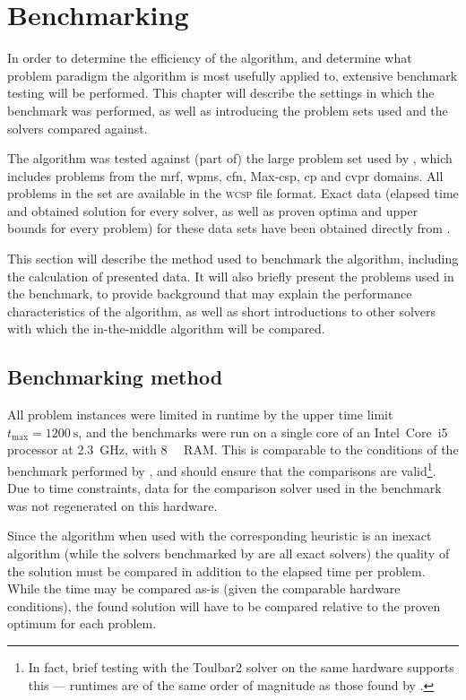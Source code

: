 \chapter{Benchmarking}
In order to determine the efficiency of the algorithm, and determine what problem paradigm the algorithm is most usefully applied to, extensive benchmark testing will be performed.
This chapter will describe the settings in which the benchmark was performed, as well as introducing the problem sets used and the solvers compared against.

The algorithm was tested against (part of) the large problem set used by \textcite{deGivry14}, which includes problems from the \gls{mrf}, \gls{wpms}, \gls{cfn}, Max-\gls{csp}, \gls{cp} and \gls{cvpr} domains.
All problems in the set are available in the \textsc{wcsp} file format.
Exact data (elapsed time and obtained solution for every solver, as well as proven optima and upper bounds for every problem) for these data sets have been obtained directly from \citeauthor{deGivry14}.

This section will describe the method used to benchmark the algorithm, including the calculation of presented data.
It will also briefly present the problems used in the benchmark, to provide background that may explain the performance characteristics of the algorithm, as well as short introductions to other solvers with which the in-the-middle algorithm will be compared.

\section{Benchmarking method}
All problem instances were limited in runtime by the upper time limit \(t_{\text{max}} = \SI{1200}{\second}\), and the benchmarks were run on a single core of an Intel~Core~i5 processor at \SI{2.3}{\giga\hertz}, with \SI{8}{\gibi\byte} RAM.
This is comparable to the conditions of the benchmark performed by \textcite{deGivry14}, and should ensure that the comparisons are valid\footnote{In fact, brief testing with the Toulbar2 solver on the same hardware supports this --- runtimes are of the same order of magnitude as those found by \textcite{deGivry14}.}.
Due to time constraints, data for the comparison solver used in the benchmark was not regenerated on this hardware.

Since the algorithm when used with the corresponding heuristic is an inexact algorithm (while the solvers benchmarked by \textcite{deGivry14} are all exact solvers) the quality of the solution must be compared in addition to the elapsed time per problem.
While the time may be compared as-is (given the comparable hardware conditions), the found solution will have to be compared relative to the proven optimum for each problem.

